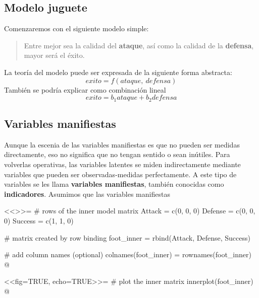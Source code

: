 \subsection{Modelo juguete}

Comenzaremos con el siguiente modelo simple:

\begin{quote}
Entre mejor sea la calidad del {\bf ataque}, as\'i como la calidad de la {\bf defensa}, mayor ser\'a el {\'exito.}
\end{quote}
La teor\'ia del modelo puede ser expresada de la siguiente forma abstracta:
\begin{displaymath}
exito = f(ataque, ~defensa)
\end{displaymath}
Tambi\'en se podr\'ia explicar como combinaci\'on lineal
\begin{displaymath}
exito = b_1 ataque + b_2 defensa
\end{displaymath}

\subsection{Variables manifiestas}

Aunque la escenia de las variables manifiestas es que no pueden ser medidas directamente, eso no significa que no tengan sentido o sean in\'utiles. Para volverlas operativas, las variables latentes se miden indirectamente mediante variables que pueden ser observadas-medidas perfectamente. A este tipo de variables se les llama {\bf variables manifiestas}, tambi\'en conocidas como {\bf indicadores}. Asumimos que las variables manifiestas







<<>>=
# rows of the inner model matrix
Attack = c(0, 0, 0)
Defense = c(0, 0, 0)
Success = c(1, 1, 0)

# matrix created by row binding
foot_inner = rbind(Attack, Defense, Success)

# add column names (optional)
colnames(foot_inner) = rownames(foot_inner)
@


\begin{center}
<<fig=TRUE, echo=TRUE>>=
# plot the inner matrix
innerplot(foot_inner)
@
\end{center}








